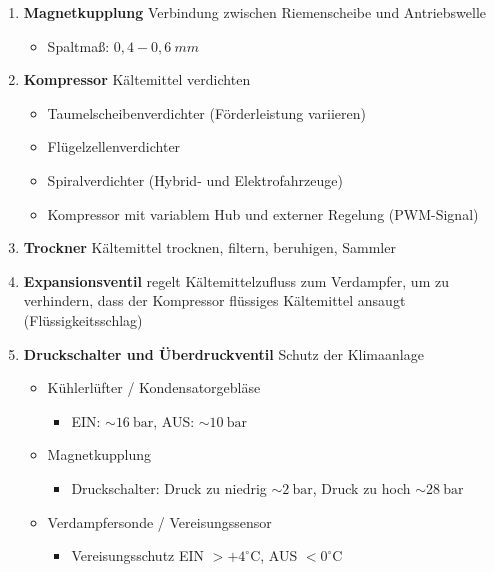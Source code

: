 \begin{enumerate}
\item
  \textbf{Magnetkupplung} Verbindung zwischen Riemenscheibe und
  Antriebswelle

  \begin{itemize}
  \item
    Spaltmaß: $0,4 - 0,6~mm$
  \end{itemize}
\item
  \textbf{Kompressor} Kältemittel verdichten

  \begin{itemize}
  \item
    Taumelscheibenverdichter (Förderleistung variieren)
  \item
    Flügelzellenverdichter
  \item
    Spiralverdichter (Hybrid- und Elektrofahrzeuge)
  \item
    Kompressor mit variablem Hub und externer Regelung (PWM-Signal)
  \end{itemize}
\item
  \textbf{Trockner} Kältemittel trocknen, filtern, beruhigen, Sammler
\item
  \textbf{Expansionsventil} regelt Kältemittelzufluss zum Verdampfer, um
  zu verhindern, dass der Kompressor flüssiges Kältemittel ansaugt
  (Flüssigkeitsschlag)
\item
  \textbf{Druckschalter und Überdruckventil} Schutz der Klimaanlage

  \begin{itemize}
  \item
    Kühlerlüfter / Kondensatorgebläse

    \begin{itemize}
    \item
      EIN: $\sim 16~\text{bar}$, AUS: $\sim 10~\text{bar}$
    \end{itemize}
  \item
    Magnetkupplung

    \begin{itemize}
    \item
      Druckschalter: Druck zu niedrig $\sim 2~\text{bar}$, Druck zu
      hoch $\sim 28~\text{bar}$
    \end{itemize}
  \item
    Verdampfersonde / Vereisungssensor

    \begin{itemize}
    \item
      Vereisungsschutz EIN $> +4^\circ \text{C}$, AUS
      $< 0^\circ \text{C}$
    \end{itemize}
  \end{itemize}
\end{enumerate}

